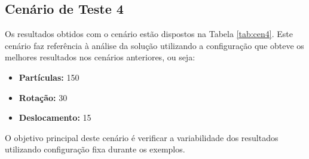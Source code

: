 \subsection{Cenário de Teste 4}

Os resultados obtidos com o cenário estão dispostos na Tabela \ref{tab:cen4}. Este cenário faz referência à análise da solução
utilizando a configuração que obteve os melhores resultados nos cenários anteriores, ou seja:

\begin{itemize}
  \item \textbf{Partículas:} 150
  \item \textbf{Rotação:} 30
  \item \textbf{Deslocamento:} 15
\end{itemize}

O objetivo principal deste cenário é verificar a variabilidade dos resultados utilizando configuração fixa durante os exemplos.


